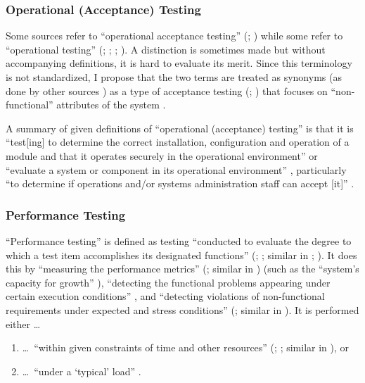\subsubsection{Operational (Acceptance) Testing}
Some sources refer to ``operational acceptance testing'' (\citealp[p.~22]{IEEE2022};
\citealpISTQB{}) while some refer to ``operational testing''
(\citealp[p.~6-9,~in the context of software engineering operations]{SWEBOK2024};
\citealp{ISO_IEC2018}; \citealp[p.~303]{IEEE2017};
\citealp[pp.~4-6,~4-9]{SWEBOK2014}). A distinction is sometimes made
\citep[p.~30]{Firesmith2015} but without accompanying definitions, it is hard
to evaluate its merit. Since this terminology is not standardized, I
propose that the two terms are treated as synonyms (as done by other sources
\citep{LambdaTest2024, BocchinoAndHamilton1996}) as a type of
acceptance testing (\citealp[p.~22]{IEEE2022}; \citealpISTQB{}) that focuses on
``non-functional'' attributes of the system \citep{LambdaTest2024}
.

A summary of given definitions of ``operational (acceptance) testing'' is that
it is ``test[ing] to determine the correct
installation, configuration and operation of a module and that it operates
securely in the operational environment'' \citep{ISO_IEC2018} or ``evaluate a
system or component in its operational environment'' \citep[p.~303]{IEEE2017},
particularly ``to determine if operations and/or systems administration staff
can accept [it]'' \citepISTQB{}.

\subsubsection{Performance Testing}
\label{perf-test-ambiguity}

``Performance testing'' is defined as testing ``conducted to evaluate the
degree to which a test item accomplishes its designated functions''
(\citealp[p.~7]{IEEE2022}; \citeyear[p.~320]{IEEE2017}; similar in
\citeyear[pp.~38-39]{IEEE2021}; \citealp[p.~1187]{Moghadam2019}). It does this
by ``measuring the performance metrics'' (\citealp[p.~1187]{Moghadam2019};
similar in \citealpISTQB{}) (such as the ``system's capacity for growth''
\citep[p.~23]{Gerrard2000b}), ``detecting the functional problems appearing
under certain execution conditions'' \citep[p.~1187]{Moghadam2019}, and
``detecting violations of non-functional requirements under expected and
stress conditions'' (\citealp[p.~1187]{Moghadam2019}; similar in
\citep[p.~5-9]{SWEBOK2024}). It is performed either \dots\
\begin{enumerate}
      \item \dots\ ``within given constraints of time and other resources''
            (\citealp[p.~7]{IEEE2022}; \citeyear[p.~320]{IEEE2017}; similar in
            \citealp[p.~1187]{Moghadam2019}), or
      \item \dots\ ``under a `typical' load'' \citep[p.~39]{IEEE2021}.
\end{enumerate}

